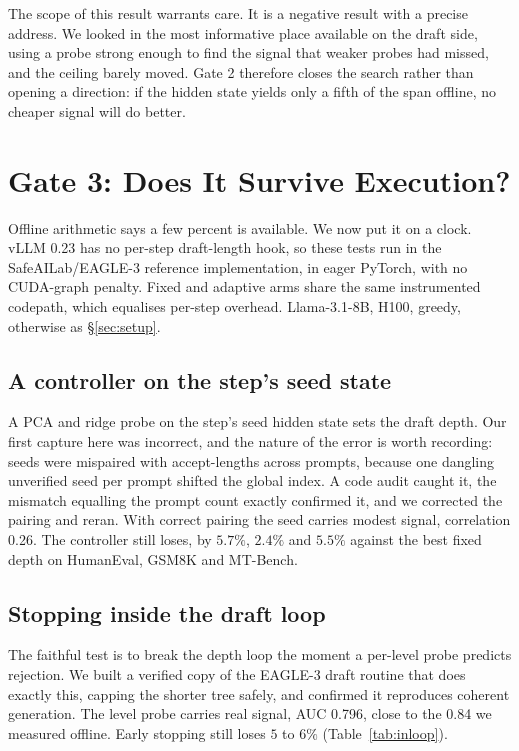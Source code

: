 \documentclass[conference]{IEEEtran}
\begin{document}
The scope of this result warrants care. It is a negative result with a precise
address. We looked in the most informative place available on the draft side, using a probe
strong enough to find the signal that weaker probes had missed, and the ceiling barely moved.
Gate 2 therefore closes the search rather than opening a direction: if the hidden state
yields only a fifth of the span offline, no cheaper signal will do better.

\section{Gate 3: Does It Survive Execution?}
\label{sec:gate3}
Offline arithmetic says a few percent is available. We now put it on a clock. vLLM 0.23 has no
per-step draft-length hook, so these tests run in the SafeAILab/EAGLE-3 reference
implementation, in eager PyTorch, with no CUDA-graph penalty. Fixed and adaptive arms share
the same instrumented codepath, which equalises per-step overhead. Llama-3.1-8B, H100, greedy,
otherwise as \S\ref{sec:setup}.

\subsection{A controller on the step's seed state}
A PCA and ridge probe on the step's seed hidden state sets the draft depth. Our first capture
here was incorrect, and the nature of the error is worth recording: seeds were mispaired with
accept-lengths across prompts, because one dangling unverified seed per prompt shifted the
global index. A code audit caught it, the mismatch equalling the prompt count exactly confirmed it, and
we corrected the pairing and reran. With correct pairing the seed carries modest signal,
correlation 0.26. The controller still loses, by $5.7\%$, $2.4\%$ and $5.5\%$ against the best
fixed depth on HumanEval, GSM8K and MT-Bench.

\subsection{Stopping inside the draft loop}
The faithful test is to break the depth loop the moment a per-level probe predicts rejection.
We built a verified copy of the EAGLE-3 draft routine that does exactly this, capping the
shorter tree safely, and confirmed it reproduces coherent generation. The level probe carries
real signal, AUC 0.796, close to the 0.84 we measured offline. Early stopping still loses $5$
to $6\%$ (Table~\ref{tab:inloop}).
\end{document}
